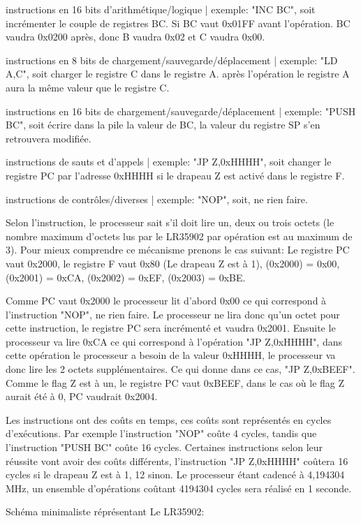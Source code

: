 \documentclass{report}
\begin{document}
instructions en 16 bits d'arithmétique/logique | exemple: "INC BC", soit incrémenter le couple de registres BC. Si BC vaut 0x01FF avant l'opération. BC vaudra 0x0200 après, donc B vaudra 0x02 et C vaudra 0x00.

instructions en 8 bits de chargement/sauvegarde/déplacement | exemple: "LD A,C", soit charger le registre C dans le registre A. après l'opération le registre A aura la même valeur que le registre C.

instructions en 16 bits de chargement/sauvegarde/déplacement | exemple: "PUSH BC", soit écrire dans la pile la valeur de BC, la valeur du registre SP s'en retrouvera modifiée.

instructions de sauts et d'appels | exemple: "JP Z,0xHHHH", soit changer le registre PC par l'adresse 0xHHHH si le drapeau Z est activé dans le registre F.

instructions de contrôles/diverses | exemple: "NOP", soit, ne rien faire.

Selon l'instruction, le processeur sait s'il doit lire un, deux ou trois octets (le nombre maximum d'octets lus par le LR35902 par opération est au maximum de 3). Pour mieux comprendre ce mécanisme prenons le cas suivant: 
Le registre PC vaut 0x2000, le registre F vaut 0x80 (Le drapeau Z est à 1), (0x2000) = 0x00, (0x2001) = 0xCA, (0x2002) = 0xEF, (0x2003) = 0xBE.

Comme PC vaut 0x2000 le processeur lit d'abord 0x00 ce qui correspond à l'instruction "NOP", ne rien faire. 
Le processeur ne lira donc qu'un octet pour cette instruction, le registre PC sera incrémenté et vaudra 0x2001.
Ensuite le processeur va lire 0xCA ce qui correspond à l'opération "JP Z,0xHHHH", dans cette opération le processeur a besoin de la valeur 0xHHHH, le processeur va donc lire les 2 octets supplémentaires. Ce qui donne dans ce cas, "JP Z,0xBEEF".
Comme le flag Z est à un, le registre PC vaut 0xBEEF, dans le cas où le flag Z aurait été à 0, PC vaudrait 0x2004.

Les instructions ont des coûts en temps, ces coûts sont représentés en cycles d'exécutions.
Par exemple l'instruction "NOP" coûte 4 cycles, tandis que l'instruction "PUSH BC" coûte 16 cycles.
Certaines instructions selon leur réussite vont avoir des coûts différents, l'instruction "JP Z,0xHHHH" coûtera 16 cycles si le drapeau Z est à 1, 12 sinon.
Le processeur étant cadencé à 4,194304 MHz, un ensemble d'opérations coûtant 4194304 cycles sera réalisé en 1 seconde.

Schéma minimaliste réprésentant Le LR35902:
\end{document}
